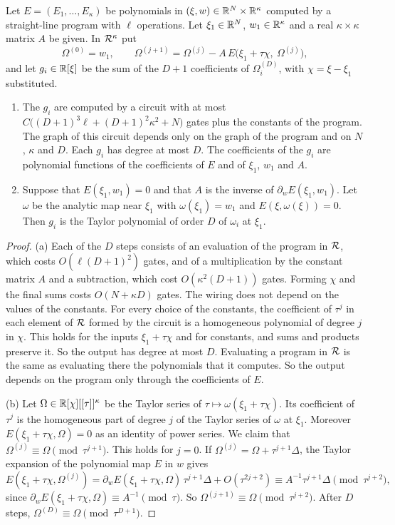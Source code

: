 \begin{lemma}\label{lem:newton}
Let $E=(E_1,\dots,E_\kappa)$ be polynomials in $(\xi,w)\in\mathbb{R}^N\times\mathbb{R}^\kappa$ computed by a straight-line program with $\ell$ operations. Let $\xi_1\in\mathbb{R}^N$, $w_1\in\mathbb{R}^\kappa$ and a real $\kappa\times\kappa$ matrix $A$ be given. In $\mathcal{R}^\kappa$ put
\[
\Omega^{(0)}=w_1,\qquad \Omega^{(j+1)}=\Omega^{(j)}-A\,E\bigl(\xi_1+\tau\chi,\ \Omega^{(j)}\bigr),
\]
and let $g_i\in\mathbb{R}[\xi]$ be the sum of the $D+1$ coefficients of $\Omega^{(D)}_i$, with $\chi=\xi-\xi_1$ substituted.
\begin{enumerate}[label=\textup{(\alph*)}]
\item The $g_i$ are computed by a circuit with at most $C\bigl((D+1)^3\ell+(D+1)^2\kappa^2+N\bigr)$ gates plus the constants of the program. The graph of this circuit depends only on the graph of the program and on $N$, $\kappa$ and $D$. Each $g_i$ has degree at most $D$. The coefficients of the $g_i$ are polynomial functions of the coefficients of $E$ and of $\xi_1$, $w_1$ and $A$.
\item Suppose that $E(\xi_1,w_1)=0$ and that $A$ is the inverse of $\partial_wE(\xi_1,w_1)$. Let $\omega$ be the analytic map near $\xi_1$ with $\omega(\xi_1)=w_1$ and $E(\xi,\omega(\xi))=0$. Then $g_i$ is the Taylor polynomial of order $D$ of $\omega_i$ at $\xi_1$.
\end{enumerate}
\end{lemma}

\begin{proof}
(a) Each of the $D$ steps consists of an evaluation of the program in $\mathcal{R}$, which costs $O(\ell(D+1)^2)$ gates, and of a multiplication by the constant matrix $A$ and a subtraction, which cost $O(\kappa^2(D+1))$ gates. Forming $\chi$ and the final sums costs $O(N+\kappa D)$ gates. The wiring does not depend on the values of the constants. For every choice of the constants, the coefficient of $\tau^j$ in each element of $\mathcal{R}$ formed by the circuit is a homogeneous polynomial of degree $j$ in $\chi$. This holds for the inputs $\xi_1+\tau\chi$ and for constants, and sums and products preserve it. So the output has degree at most $D$. Evaluating a program in $\mathcal{R}$ is the same as evaluating there the polynomials that it computes. So the output depends on the program only through the coefficients of $E$.

(b) Let $\Omega\in\mathbb{R}[\chi][[\tau]]^\kappa$ be the Taylor series of $\tau\mapsto\omega(\xi_1+\tau\chi)$. Its coefficient of $\tau^j$ is the homogeneous part of degree $j$ of the Taylor series of $\omega$ at $\xi_1$. Moreover $E(\xi_1+\tau\chi,\Omega)=0$ as an identity of power series. We claim that $\Omega^{(j)}\equiv\Omega\pmod{\tau^{j+1}}$. This holds for $j=0$. If $\Omega^{(j)}=\Omega+\tau^{j+1}\Delta$, the Taylor expansion of the polynomial map $E$ in $w$ gives
\[
E(\xi_1+\tau\chi,\Omega^{(j)})=\partial_wE(\xi_1+\tau\chi,\Omega)\,\tau^{j+1}\Delta+O(\tau^{2j+2})\equiv A^{-1}\tau^{j+1}\Delta\pmod{\tau^{j+2}},
\]
since $\partial_wE(\xi_1+\tau\chi,\Omega)\equiv A^{-1}\pmod\tau$. So $\Omega^{(j+1)}\equiv\Omega\pmod{\tau^{j+2}}$. After $D$ steps, $\Omega^{(D)}\equiv\Omega\pmod{\tau^{D+1}}$.
\end{proof}

